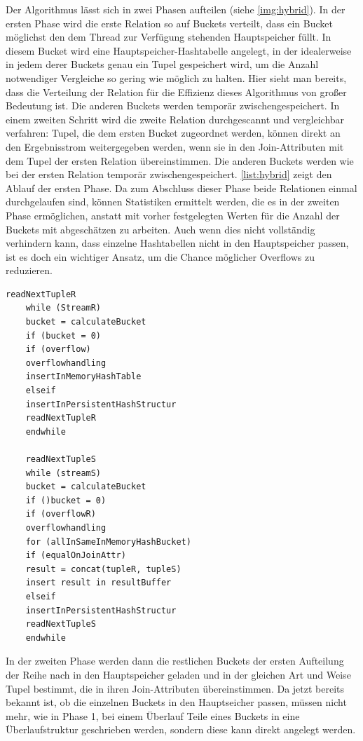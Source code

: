 \documentclass[a4paper,12pt,twoside]{article}
\begin{document}
Der Algorithmus lässt sich in zwei Phasen aufteilen (siehe \autoref{img:hybrid}). In der ersten Phase wird die erste Relation so auf Buckets verteilt, dass ein Bucket möglichst den dem Thread zur Verfügung stehenden Hauptspeicher füllt. In diesem Bucket wird eine Hauptspeicher-Hashtabelle angelegt, in der idealerweise in jedem derer Buckets genau ein Tupel gespeichert wird, um die Anzahl notwendiger Vergleiche so gering wie möglich zu halten. Hier sieht man bereits, dass die Verteilung der Relation für die Effizienz dieses Algorithmus von großer Bedeutung ist. Die anderen Buckets werden temporär zwischengespeichert. In einem zweiten Schritt wird die zweite Relation durchgescannt und vergleichbar verfahren: Tupel, die dem ersten Bucket zugeordnet werden, können direkt an den Ergebnisstrom weitergegeben werden, wenn sie in den Join-Attributen mit dem Tupel der ersten Relation übereinstimmen. Die anderen Buckets werden wie bei der ersten Relation temporär zwischengespeichert. \autoref{list:hybrid} zeigt den Ablauf der ersten Phase. Da zum Abschluss dieser Phase beide Relationen einmal durchgelaufen sind, können Statistiken ermittelt werden, die es in der zweiten Phase ermöglichen, anstatt mit vorher festgelegten Werten für die Anzahl der Buckets mit abgeschätzen zu arbeiten. Auch wenn dies nicht vollständig verhindern kann, dass einzelne Hashtabellen nicht in den Hauptspeicher passen, ist es doch ein wichtiger Ansatz, um die Chance möglicher Overflows zu reduzieren.   

\begin{minipage}{\linewidth}
	\begin{lstlisting}[caption={Phase 1 Hybrid Hash Join}, label=list:hybrid] 
	readNextTupleR
	while (StreamR) 
	bucket = calculateBucket
	if (bucket = 0)
	if (overflow)
	overflowhandling
	insertInMemoryHashTable
	elseif
	insertInPersistentHashStructur
	readNextTupleR
	endwhile
	
	readNextTupleS
	while (streamS)
	bucket = calculateBucket
	if ()bucket = 0)
	if (overflowR)
	overflowhandling
	for (allInSameInMemoryHashBucket)
	if (equalOnJoinAttr)
	result = concat(tupleR, tupleS)
	insert result in resultBuffer
	elseif
	insertInPersistentHashStructur
	readNextTupleS
	endwhile
	\end{lstlisting}
\end{minipage}

In der zweiten Phase werden dann die restlichen Buckets der ersten Aufteilung der Reihe nach in den Hauptspeicher geladen und in der gleichen Art und Weise Tupel bestimmt, die in ihren Join-Attributen übereinstimmen. Da jetzt bereits bekannt ist, ob die einzelnen Buckets in den Hauptseicher passen, müssen nicht mehr, wie in Phase 1, bei einem Überlauf Teile eines Buckets in eine Überlaufstruktur geschrieben werden, sondern diese kann direkt angelegt werden.
\end{document}
